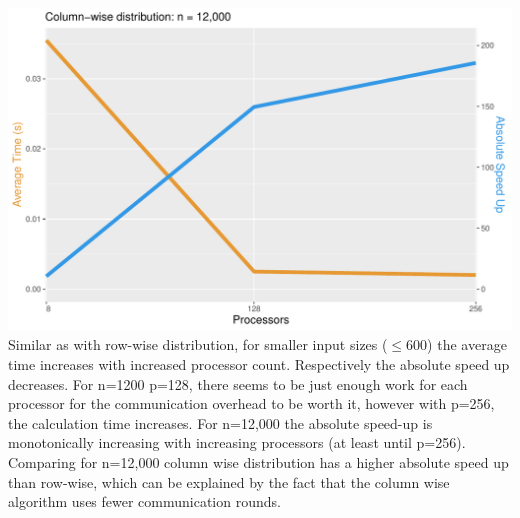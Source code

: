 \documentclass[a4paper,%
11pt,%
DIV=12,
headsepline,%
headings=normal,
]{scrartcl}
\begin{document}
\includegraphics[scale=0.4,page=1]{../plots/matrix_vector_plot_Column-wise-distribution_12000} \\

Similar as with row-wise distribution, for smaller input sizes ($\leq$600) the average time increases with increased processor count. Respectively the absolute speed up decreases. For n=1200 p=128, there seems to be just enough work for each processor for the communication overhead to be worth it, however with p=256, the calculation time increases. For n=12,000 the absolute speed-up is monotonically increasing with increasing processors (at least until p=256). Comparing for n=12,000 column wise distribution has a higher absolute speed up than row-wise, which can be explained by the fact that the column wise algorithm uses fewer communication rounds.
\end{document}
